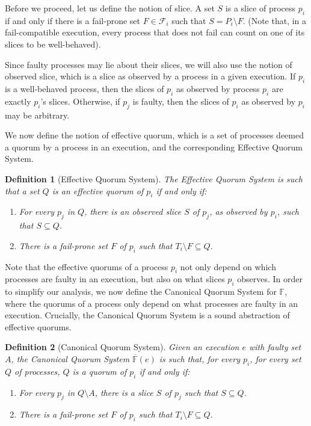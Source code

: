 \documentclass[11pt,letterpaper]{article}
\newtheorem{definition}{Definition}
\begin{document}
Before we proceed, let us define the notion of slice.
A set $S$ is a slice of process $p_i$ if and only if there is a fail-prone set $F\in \mathcal{F}_i$ such that $S=P_i\setminus F$.
(Note that, in a fail-compatible execution, every process that does not fail can count on one of its slices to be well-behaved).

Since faulty processes may lie about their slices, we will also use the notion of observed slice, which is a slice as observed by a process in a given execution.
If $p_i$ is a well-behaved process, then the slices of $p_i$ as observed by process $p_i$ are exactly $p_i$'s slices.
Otherwise, if $p_j$ is faulty, then the slices of $p_i$ as observed by $p_i$ may be arbitrary.

We now define the notion of effective quorum, which is a set of processes deemed a quorum by a process in an execution, and the corresponding Effective Quorum System.
\begin{definition}[Effective Quorum System]
  The Effective Quorum System is such that a set $Q$ is an effective quorum of $p_i$ if and only if:
  \begin{enumerate}
    \item For every $p_j$ in $Q$, there is an observed slice $S$ of $p_j$, as observed by $p_i$, such that $S \subseteq Q$.
    \item There is a fail-prone set $F$ of $p_i$ such that $T_i\setminus F \subseteq Q$.
  \end{enumerate}
\end{definition}

Note that the effective quorums of a process $p_i$ not only depend on which processes are faulty in an execution, but also on what slices $p_i$ observes.
In order to simplify our analysis, we now define the Canonical Quorum System for $\mathbb{F}$, where the quorums of a process only depend on what processes are faulty in an execution.
Crucially, the Canonical Quorum System is a sound abstraction of effective quorums.

\begin{definition}[Canonical Quorum System]
  Given an execution $e$ with faulty set $A$, the Canonical Quorum System $\overline{\mathbb{F}}(e)$ is such that, for every $p_i$, for every set $Q$ of processes, $Q$ is a quorum of $p_i$ if and only if:
\begin{enumerate}
  \item For every $p_j$ in $Q\setminus A$, there is a slice $S$ of $p_j$ such that $S \subseteq Q$.
    \label{def:quorum_1}
  \item There is a fail-prone set $F$ of $p_i$ such that $T_i\setminus F \subseteq Q$.
\end{enumerate}
\end{definition}
\end{document}
